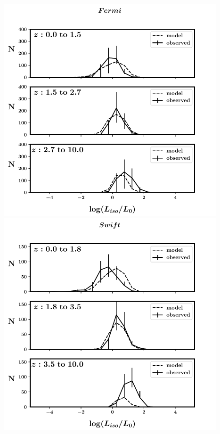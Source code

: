 \begin{figure}
\begin{center}
\includegraphics[scale=0.41]{ECPL--Fermi--binned}
\includegraphics[scale=0.41]{ECPL--Swift--binned}

\end{center}
\end{figure}
